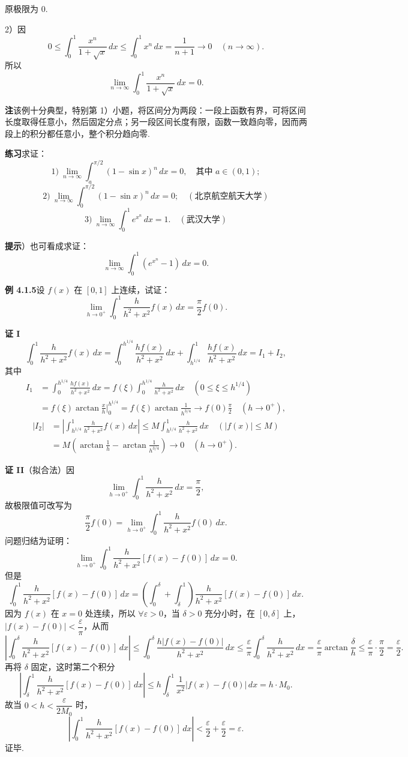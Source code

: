 \documentclass[UTF8, 12pt, fontset=fandol, oneside]{ctexart}
\begin{document}
原极限为 $0$.

2）因
\[
0\le\int_0^1\frac{x^n}{1+\sqrt{x}}\,dx
\le\int_0^1x^n\,dx=\frac1{n+1}\to0\quad(n\to\infty).
\]
所以
\[
\lim_{n\to\infty}\int_0^1\frac{x^n}{1+\sqrt{x}}\,dx=0.
\]

\noindent\textbf{注}\quad 该例十分典型，特别第 1）小题，将区间分为两段：一段上函数有界，可将区间长度取得任意小，然后固定分点；另一段区间长度有限，函数一致趋向零，因而两段上的积分都任意小，整个积分趋向零.

\noindent\textbf{练习}\quad 求证：
\[
1)\ \lim_{n\to\infty}\int_a^{\pi/2}(1-\sin x)^n\,dx=0,\quad \text{其中 }a\in(0,1);
\]
\[
2)\ \lim_{n\to\infty}\int_0^{\pi/2}(1-\sin x)^n\,dx=0;\quad(\text{北京航空航天大学})
\]
\[
3)\ \lim_{n\to\infty}\int_0^1 e^{x^n}\,dx=1.\quad(\text{武汉大学})
\]

\noindent\textbf{提示}）也可看成求证：
\[
\lim_{n\to\infty}\int_0^1(e^{x^n}-1)\,dx=0.
\]

\noindent\textbf{例 4.1.5}\quad 设 $f(x)$ 在 $[0,1]$ 上连续，试证：
\[
\lim_{h\to0^+}\int_0^1\frac{h}{h^2+x^2}f(x)\,dx
=\frac\pi2 f(0).
\]

\noindent\textbf{证 I}\quad
\[
\int_0^1\frac{h}{h^2+x^2}f(x)\,dx
=\int_0^{h^{1/4}}\frac{hf(x)}{h^2+x^2}\,dx
+\int_{h^{1/4}}^1\frac{hf(x)}{h^2+x^2}\,dx=I_1+I_2,
\]
其中
\[
\begin{aligned}
I_1&=\int_0^{h^{1/4}}\frac{hf(x)}{h^2+x^2}\,dx
=f(\xi)\int_0^{h^{1/4}}\frac{h}{h^2+x^2}\,dx\quad(0\le\xi\le h^{1/4})\\
&=f(\xi)\arctan\frac{x}{h}\bigg|_0^{h^{1/4}}
=f(\xi)\arctan\frac1{h^{3/4}}\to f(0)\frac\pi2
\quad(h\to0^+),
\end{aligned}
\]
\[
\begin{aligned}
|I_2|
&=\left|\int_{h^{1/4}}^1\frac{h}{h^2+x^2}f(x)\,dx\right|
\le M\int_{h^{1/4}}^1\frac{h}{h^2+x^2}\,dx\quad(|f(x)|\le M)\\
&=M\left(\arctan\frac1h-\arctan\frac1{h^{3/4}}\right)\to0
\quad(h\to0^+).
\end{aligned}
\]

\noindent\textbf{证 II}\quad （拟合法）因
\[
\lim_{h\to0^+}\int_0^1\frac{h}{h^2+x^2}\,dx=\frac\pi2,
\]
故极限值可改写为
\[
\frac\pi2f(0)=\lim_{h\to0^+}\int_0^1\frac{h}{h^2+x^2}f(0)\,dx.
\]
问题归结为证明：
\[
\lim_{h\to0^+}\int_0^1
\frac{h}{h^2+x^2}\left[f(x)-f(0)\right]\,dx=0.
\]
但是
\[
\int_0^1\frac{h}{h^2+x^2}[f(x)-f(0)]\,dx
=\left(\int_0^\delta+\int_\delta^1\right)
\frac{h}{h^2+x^2}[f(x)-f(0)]\,dx.
\]
因为 $f(x)$ 在 $x=0$ 处连续，所以 $\forall\varepsilon>0$，当 $\delta>0$ 充分小时，在 $[0,\delta]$ 上，
$|f(x)-f(0)|<\dfrac\varepsilon\pi$，从而
\[
\left|\int_0^\delta\frac{h}{h^2+x^2}[f(x)-f(0)]\,dx\right|
\le\int_0^\delta\frac{h|f(x)-f(0)|}{h^2+x^2}\,dx
\le\frac\varepsilon\pi\int_0^\delta\frac{h}{h^2+x^2}\,dx
=\frac\varepsilon\pi\arctan\frac\delta h\le\frac\varepsilon\pi\cdot\frac\pi2=\frac\varepsilon2.
\]
再将 $\delta$ 固定，这时第二个积分
\[
\left|\int_\delta^1\frac{h}{h^2+x^2}[f(x)-f(0)]\,dx\right|
\le h\int_\delta^1\frac1{x^2}|f(x)-f(0)|\,dx=h\cdot M_0.
\]
故当 $0<h<\dfrac{\varepsilon}{2M_0}$ 时，
\[
\left|\int_0^1\frac{h}{h^2+x^2}[f(x)-f(0)]\,dx\right|
<\frac\varepsilon2+\frac\varepsilon2=\varepsilon.
\]
证毕.
\end{document}
